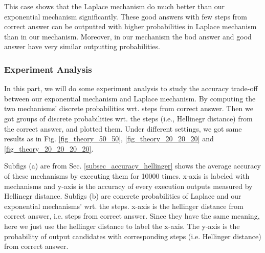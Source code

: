 \begin{itemize}
\begin{itemize}
		This case shows that the Laplace mechanism do much better than our exponential mechanism significantly. These good answers with few steps from correct answer can be outputted with higher probabilities in Laplace mechanism than in our mechanism. Moreover, in our mechanism the bod answer and good answer have very similar outputting probabilities.

	\end{itemize}  

\end{itemize}


\subsubsection{Experiment Analysis}
In this part, we will do some experiment analysis to study the accuracy trade-off between our exponential mechanism and Laplace mechanism. By computing the two mechanisms' discrete probabilities wrt. steps from correct answer. Then we got groups of discrete probabilities wrt. the steps (i.e., Hellinegr distance) from the correct answer, and plotted them. Under different settings, we got same results as in Fig. \ref{fig_theory_50_50}, \ref{fig_theory_20_20_20} and \ref{fig_theory_20_20_20_20}. 

Subfigs (a) are from Sec. \ref{subsec_accuracy_hellinger} shows the average accuracy of these mechanisms by executing them for 10000 times. x-axis is labeled with mechanisms and y-axis is the accuracy of every execution outputs measured by Hellinegr distance. Subfigs (b) are concrete probabilities of Laplace and our exponential mechanisms' wrt. the steps. x-axis is the hellinger distance from correct answer, i.e. steps from correct answer. Since they have the same meaning, here we just use the hellinger distance to label the x-axis. The y-axis is the probability of output candidates with corresponding steps (i.e. Hellinger distance) from correct answer.

